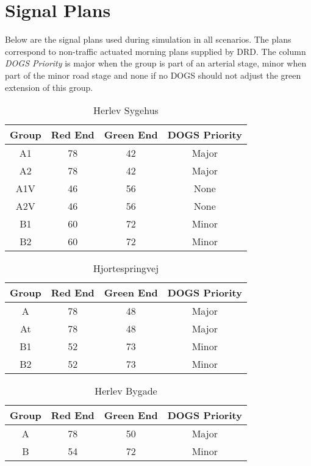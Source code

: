 \section{Signal Plans}
\label{app:signalplans}
Below are the signal plans used during simulation in all scenarios. The plans correspond to non-traffic actuated morning plans supplied by DRD. The column \textit{DOGS Priority} is major when the group is part of an arterial stage, minor when part of the minor road stage and none if no DOGS should not adjust the green extension of this group.

\begin{table}[ht]
\centering
\begin{tabular}{c|c|c|c}
\textbf{Group} & \textbf{Red End} & \textbf{Green End} & \textbf{DOGS Priority}\\ \hline
A1 & 78 & 42 & Major\\
A2 & 78 & 42 & Major\\
A1V & 46 & 56 & None\\
A2V & 46 & 56 & None\\
B1 & 60 & 72 & Minor\\
B2 & 60 & 72 & Minor\\
\end{tabular}
\caption{Herlev Sygehus}
\end{table}



\begin{table}[ht]
\centering
\begin{tabular}{c|c|c|c}
\textbf{Group} & \textbf{Red End} & \textbf{Green End} & \textbf{DOGS Priority}\\ \hline
A & 78 & 48 & Major\\
At & 78 & 48 & Major\\
B1 & 52 & 73 & Minor\\
B2 & 52 & 73 & Minor\\
\end{tabular}
\caption{Hjortespringvej}
\end{table}



\begin{table}[ht]
\centering
\begin{tabular}{c|c|c|c}
\textbf{Group} & \textbf{Red End} & \textbf{Green End} & \textbf{DOGS Priority}\\ \hline
A & 78 & 50 & Major\\
B & 54 & 72 & Minor\\
\end{tabular}
\caption{Herlev Bygade}
\end{table}



